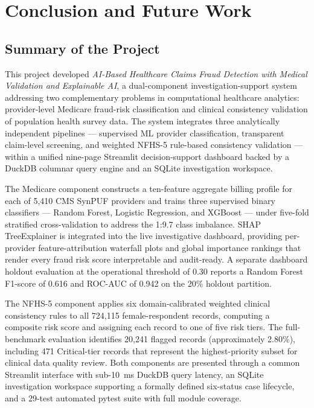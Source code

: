 \chapter{Conclusion and Future Work}
\label{ch:conclusion}

\section{Summary of the Project}

This project developed \textit{AI-Based Healthcare Claims Fraud Detection with Medical Validation and Explainable AI}, a dual-component investigation-support system addressing two complementary problems in computational healthcare analytics: provider-level Medicare fraud-risk classification and clinical consistency validation of population health survey data. The system integrates three analytically independent pipelines --- supervised ML provider classification, transparent claim-level screening, and weighted NFHS-5 rule-based consistency validation --- within a unified nine-page Streamlit decision-support dashboard backed by a DuckDB columnar query engine and an SQLite investigation workspace.

The Medicare component constructs a ten-feature aggregate billing profile for each of 5,410 CMS SynPUF providers and trains three supervised binary classifiers --- Random Forest, Logistic Regression, and XGBoost --- under five-fold stratified cross-validation to address the 1:9.7 class imbalance. SHAP TreeExplainer is integrated into the live investigative dashboard, providing per-provider feature-attribution waterfall plots and global importance rankings that render every fraud risk score interpretable and audit-ready. A separate dashboard holdout evaluation at the operational threshold of 0.30 reports a Random Forest F1-score of 0.616 and ROC-AUC of 0.942 on the 20\% holdout partition.

The NFHS-5 component applies six domain-calibrated weighted clinical consistency rules to all 724,115 female-respondent records, computing a composite risk score and assigning each record to one of five risk tiers. The full-benchmark evaluation identifies 20,241 flagged records (approximately 2.80\%), including 471 Critical-tier records that represent the highest-priority subset for clinical data quality review. Both components are presented through a common Streamlit interface with sub-10~ms DuckDB query latency, an SQLite investigation workspace supporting a formally defined six-status case lifecycle, and a 29-test automated pytest suite with full module coverage.

